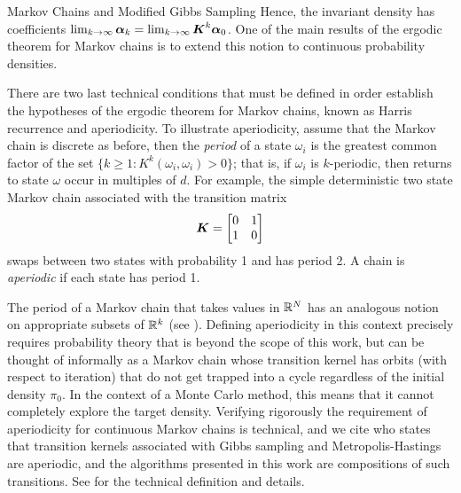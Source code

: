 \begin{chapter}{Markov Chains and Modified Gibbs Sampling}
Hence, the invariant density has coefficients $\lim_{k\to \infty}\mbox{\boldmath$\alpha$}_k = \lim_{k\to \infty} \mbox{\boldmath$K$}^k \mbox{\boldmath$\alpha$}_0$.
One of the main results of the ergodic theorem for Markov chains is to extend this notion to continuous probability densities.

There are two last technical conditions that must be defined in order establish the hypotheses of the ergodic theorem for Markov chains, known as Harris recurrence and aperiodicity.
To illustrate aperiodicity, assume that the Markov chain is discrete as before, then the \emph{period} of a state $\omega_i$ is the greatest common factor of the set $\{k\ge 1: K^k(\omega_i,\omega_i) > 0\}$; that is, if $\omega_i$ is $k$-periodic, then returns to state $\omega$ occur in multiples of $d$.
For example, the simple deterministic two state Markov chain associated with the transition matrix
\begin{equation}
  \mbox{\boldmath$K$} = \begin{bmatrix}
    0 & 1\\
    1 & 0
  \end{bmatrix}
\end{equation}
swaps between two states with probability 1 and has period 2.
A chain is \emph{aperiodic} if each state has period 1. 

The period of a Markov chain that takes values in $\mathbb R^N$ has an analogous notion on appropriate subsets of $\mathbb R^k$ (see \citep{robert2013monte}).
Defining aperiodicity in this context precisely requires probability theory that is beyond the scope of this work, but can be thought of informally as a Markov chain whose transition kernel has orbits (with respect to iteration) that do not get trapped into a cycle regardless of the initial density $\pi_0$. 
In the context of a Monte Carlo method, this means that it cannot completely explore the target density.
Verifying rigorously the requirement of aperiodicity for continuous Markov chains is technical, and we cite \citep{liu2008monte} who states that transition kernels associated with Gibbs sampling and Metropolis-Hastings are aperiodic, and the algorithms presented in this work are compositions of such transitions.
See \citep{robert2013monte} for the technical definition and details.


\end{chapter}
